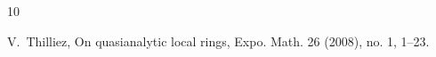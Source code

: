 \documentclass[11pt,a4paper]{article}
\theoremstyle{plain}
\theoremstyle{definition}
\begin{document}
\begin{thebibliography}{10}
	
	
%	
%	
%	
%	
	
	V.~Thilliez, On quasianalytic local rings, Expo. Math. 26 (2008), no. 1, 1--23.
\end{thebibliography}





%
%
%
\end{document}
